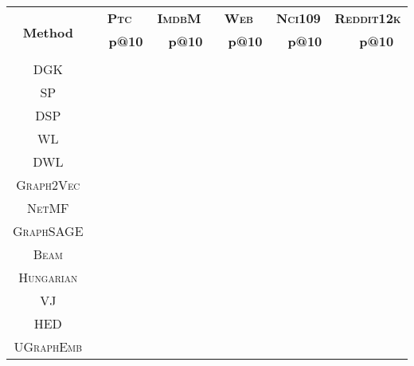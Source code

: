 \documentclass{article}
\newcommand{\model}{\textsc{UGraphEmb}\xspace}
\newcommand{\netmf}{\textsc{NetMF}\xspace}
\newcommand{\graphsage}{\textsc{GraphSAGE}\xspace}
\newcommand{\gv}{\textsc{Graph2Vec}\xspace}
\newcommand{\beam}{\textsc{Beam}\xspace}
\newcommand{\hungarian}{\textsc{Hungarian}\xspace}
\newcommand{\vj}{\textsc{VJ}\xspace}
\newcommand{\hed}{\textsc{HED}\xspace}
\newcommand{\ptc}{\textsc{Ptc}\xspace}
\newcommand{\imdb}{\textsc{ImdbM}\xspace}
\newcommand{\web}{\textsc{Web}\xspace}
\newcommand{\nci}{\textsc{Nci109}\xspace}
\newcommand{\reddit}{\textsc{Reddit12k}\xspace}
\begin{document}
\begin{table*}
\centering
\vspace{-0.05in}
  \begin{tabular}{ccccccccccc}
    \toprule
    \multirow{3}{*}{\textbf{Method}} &
      \multicolumn{2}{c}{\textbf{\ptc}} &
      \multicolumn{2}{c}{\textbf{\imdb}} &
      \multicolumn{2}{c}{\textbf{\web}} &
      \multicolumn{2}{c}{\textbf{\nci}} &
      \multicolumn{2}{c}{\textbf{\reddit}} \\
      & \textbf{} & \textbf{p@10} & \textbf{} & \textbf{p@10} & \textbf{} & \textbf{p@10} & \textbf{} & \textbf{p@10} & \textbf{} & \textbf{p@10} \\
      \midrule

      


    \textsc{GK} &  &  &  &  &  &  &  &  &  &  \\
    \textsc{DGK} &  &  &  &  &  &  &  &  &  &  \\ 
    \textsc{SP} &  &  &  &  &  &  &  &  &  &  \\
    \textsc{DSP} &  &  &  &  &  &  &  &  &  &  \\
    \textsc{WL} &  &  &  &  &  &  &  &  &  &  \\ 
    \textsc{DWL} &  &  &  &  &  &  &  &  &  &  \\ \hline
    \gv &  &  &  &  &  &  &  &  &  &  \\
    \netmf &  &  &  &  &  &  &  &  &  &  \\
    \graphsage &  &  &  &  &  &  &  &  &  &  \\
\hline
    \beam &  &  &  &  &  &  &  &  &  &  \\
    \hungarian &  &  &  &  &  &  &  &  &  &  \\
    \vj &  &  &  &  &  &  &  &  &  &  \\
    \hed &  &  &  &  &  &  &  &  &  &  \\ \hline
\textsc{\model} &  &  &  &  &  &  &  &  &  &  \\ \hline
\end{tabular}
\centering
\caption{Similarity ranking performance. \beam, \hungarian, and \vj are three approximate GED computation algorithms returning upper bounds of exact GEDs. We take the minimum GED computed by the three as ground-truth GEDs for training and evaluating all the methods on both Task 1 and 2. Their results are labeled with ``''. \hed is another GED solver yielding lower bounds. ``-'' indicates that the computation did not finish after 72 hours.}
\label{table:sim_results}
\end{table*}
\end{document}
